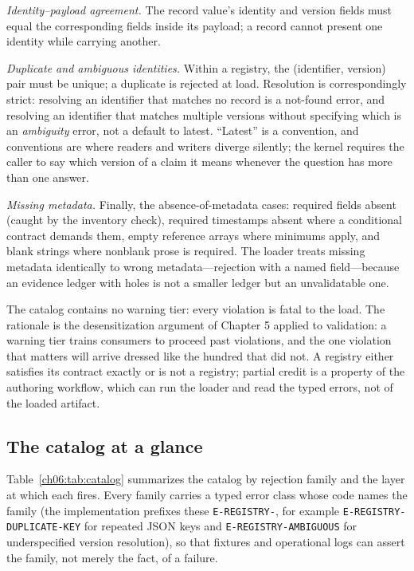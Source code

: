 \emph{Identity--payload agreement.} The record value's identity and
version fields must equal the corresponding fields inside its payload;
a record cannot present one identity while carrying another.

\emph{Duplicate and ambiguous identities.} Within a registry, the
(identifier, version) pair must be unique; a duplicate is rejected at
load. Resolution is correspondingly strict: resolving an identifier that
matches no record is a not-found error, and resolving an identifier that
matches multiple versions without specifying which is an
\emph{ambiguity} error, not a default to latest. ``Latest'' is a
convention, and conventions are where readers and writers diverge
silently; the kernel requires the caller to say which version of a claim
it means whenever the question has more than one answer.

\emph{Missing metadata.} Finally, the absence-of-metadata cases: required
fields absent (caught by the inventory check), required timestamps absent
where a conditional contract demands them, empty reference arrays where
minimums apply, and blank strings where nonblank prose is required. The
loader treats missing metadata identically to wrong metadata---rejection
with a named field---because an evidence ledger with holes is not a
smaller ledger but an unvalidatable one.

\begin{remark}\label{ch06:rem:nowarnings}
The catalog contains no warning tier: every violation is fatal to the
load. The rationale is the desensitization argument of Chapter 5 applied
to validation: a warning tier trains consumers to proceed past
violations, and the one violation that matters will arrive dressed like
the hundred that did not. A registry either satisfies its contract
exactly or is not a registry; partial credit is a property of the
authoring workflow, which can run the loader and read the typed errors,
not of the loaded artifact.
\end{remark}

\subsection{The catalog at a glance}

Table~\ref{ch06:tab:catalog} summarizes the catalog by rejection family
and the layer at which each fires. Every family carries a typed error
class whose code names the family (the implementation prefixes these
\texttt{E-REGISTRY-}, for example
\texttt{E-REGISTRY-DUPLICATE-KEY} for repeated JSON keys and
\texttt{E-REGISTRY-AMBIGUOUS} for underspecified version resolution),
so that fixtures and operational logs can assert the family, not merely
the fact, of a failure.


